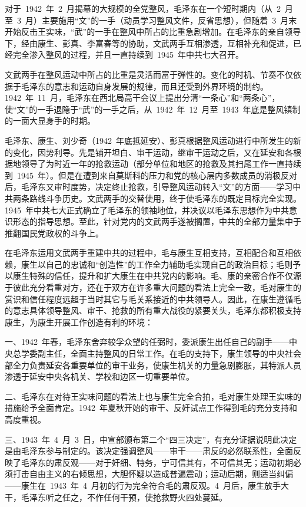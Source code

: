 对于~1942~年~2~月揭幕的大规模的全党整风，毛泽东在一个短时期内（从~2~月至~3~月）主要施用“文”的一手（动员学习整风文件，反省思想），但随着~3~月末开始反击王实味，“武”的一手在整风中所占的比重急剧增加。在毛泽东的亲自领导下，经由康生、彭真、李富春等的协助，文武两手互相渗透，互相补充和促进，已经完全渗入整风的过程，并且一直持续到~1945~年中共七大召开。

文武两手在整风运动中所占的比重是灵活而富于弹性的。变化的时机、节奏不仅依据于毛泽东的意志和运动自身发展的规律，而且还受到外界环境的制约。1942~年~11~月，毛泽东在西北局高干会议上提出分清“一条心”和“两条心”，使“文”的一手退隐于“武”的一手之后，从~1942~年~12~月至~1943~年底是整风镇制的一面大显身手的时期。

毛泽东、康生、刘少奇（1942~年底抵延安）、彭真根据整风运动进行中所发生的新的变化，因势利导。先是铺开坦白、审干运动，继审干运动之后，又在延安和各根据地领导了为时近一年的抢救运动（部分单位和地区的抢救及其扫尾工作一直持续到~1945~年）。但是在遭到来自莫斯科的压力和党的核心层内多数成员的消极反对后，毛泽东又审时度势，决定终止抢救，引导整风运动转入“文”的方面——学习中共两条路线斗争历史。文武两手的交替使用，终于使毛泽东的既定目标完全实现。1945~年中共七大正式确立了毛泽东的领袖地位，并决议以毛泽东思想作为中共意识形态的指导思想。至此，针对党内的文武两手遂被搁置，中共的全部力量集中于推翻国民党政权的斗争上。

在毛泽东运用文武两手重建中共的过程中，毛与康生互相支持，互相配合和互相依赖，康生以自己的忠诚和“创造性”的工作全力辅助毛实现自己的政治目标；毛则予以康生特殊的信任，提升和扩大康生在中共党内的影响。毛、康的亲密合作不仅源于彼此充分看重对方，还在于双方在许多重大问题的看法上完全一致，毛对康生的赏识和信任程度远超于当时其它与毛关系接近的中共领导人。因此，在康生遵循毛的意志具体领导整风、审干、抢救的所有重大战役的紧要关头，毛泽东都积极支持康生，为康生开展工作创造有利的环境：

一、1942~年春，毛泽东舍弃较孚众望的任弼时，委派康生出任自己的副手——中央总学委副主任，全面主持整风的日常工作。在毛的支持下，康生领导的中央社会部全力负责延安各重要单位的审干业务，使康生机关的力量急剧膨胀，其特派人员渗透于延安中央各机关、学校和边区一切重要单位。

二、毛泽东在对待王实味问题的看法上也与康生完全合拍，毛对康生处理王实味的措施给予全面肯定。1942~年夏秋开始的审干、反奸试点工作得到毛的充分支持和高度重视。

三、1943~年~4~月~3~日，中宣部颁布第二个“四三决定”，有充分证据说明此决定是由毛泽东参与制定的。该决定强调整风——审干——肃反的必然联系性，全面反映了毛泽东的肃反观——对于奸细、特务，宁可信其有，不可信其无；运动初期必须打击自由主义的右倾思想，大胆怀疑以造成普遍震动；运动后期，则适当纠偏——康生在~1943~年~4~月初的行为完全符合毛的肃反观。4~月后，康生放手大干，毛泽东听之任之，不作任何干预，使抢救野火四处蔓延。


